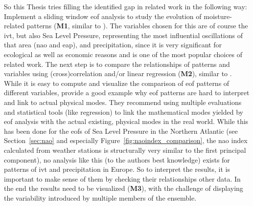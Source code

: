 So this Thesis tries filling the identified gap in related work in the following way: 
Implement a sliding window \ac{eof} analysis to study the evolution of moisture-related patterns (\textbf{M1}, similar to \cite{vietinghoffdiss, zou_interdecadal_2018}). 
The variables chosen for this are of course the \ac{ivt}, but also Sea Level Pressure, representing the most influential oscillations of that area (\ac{nao} and \ac{eap}), and precipitation, since it is very significant for ecological as well as economic reasons and is one of the most popular choices of related work. 
The next step is to compare the relationships of patterns and variables using (cross)correlation and/or linear regression (\textbf{M2}), similar to \cite{zou_interdecadal_2018, zou_investigating_2020, yao_simulation_2013}. 
While it is easy to compute and visualize the comparison of \ac{eof} patterns of different variables,  provide a good example why \ac{eof} patterns are hard to interpret and link to actual physical modes. 
They recommend using multiple evaluations and statistical tools (like regression) to link the mathematical modes yielded by \ac{eof} analysis with the actual existing, physical modes in the real world. 
While this has been done for the \acp{eof} of Sea Level Pressure in the Northern Atlantic (see Section~\ref{sec:nao} and especially Figure~\ref{fig:naoindex_comparison}, the \ac{nao} index calculated from weather stations is structurally very similar to the first principal component), no analysis like this (to the authors best knowledge) exists for patterns of \ac{ivt} and precipitation in Europe.  
So to interpret the results, it is important to make sense of them by checking their relationships other data. 
In the end the results need to be visualized (\textbf{M3}), with the challenge of displaying the variability introduced by multiple members of the ensemble. 

